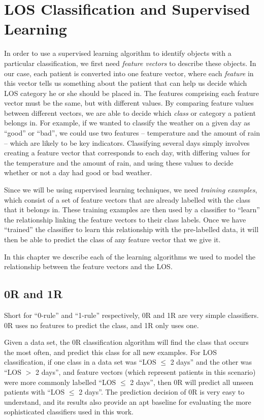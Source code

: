 \chapter{LOS Classification and Supervised Learning}
  \label{chap:classification}

In order to use a supervised learning algorithm to identify objects with
a particular classification, we first need \textit{feature vectors} to
describe these objects. In our case, each patient is converted into one
feature vector, where each \textit{feature} in this vector tells us
something about the
patient that can help us decide which LOS category he or she should be
placed in. The features comprising each feature vector must be the same,
but with different values. By comparing feature values between different
vectors, we are able to decide which \textit{class} or category a patient
belongs in. For example, if we wanted to classify the weather on a given
day as ``good'' or ``bad'', we could use two features -- temperature and
the amount of rain -- which are likely to be key indicators. Classifying
several days simply involves creating a feature vector that corresponds
to each day, with differing values for the temperature and the amount of
rain, and using these values to decide whether or not a day had good or
bad weather.

Since we will be using supervised learning techniques, we need
\textit{training examples}, which consist of a set of feature vectors
that are already labelled with the class that it belongs in. These
training examples are then used by a classifier to ``learn'' the
relationship linking the feature vectors to their class labels. Once we have
``trained'' the classifier to learn this relationship with the pre-labelled
data, it will then be able to predict the class of any feature vector that we
give it.

In this
chapter we describe each of the learning algorithms we used to model the
relationship between the feature vectors and the LOS.

\section{0R and 1R}
Short for ``0-rule'' and ``1-rule'' respectively, 0R and 1R are
very simple classifiers. 0R uses no features to predict the class, and
1R only uses one.

Given a data set, the 0R classification algorithm will find the class that
occurs the most often, and predict this class for all new examples. For LOS
classification, if one class in a data set was ``LOS $\leq$ 2 days'' and
the other was
``LOS $>$ 2 days'', and feature vectors (which represent patients in this
scenario) were more commonly labelled ``LOS $\leq$ 2 days'', then 0R will
predict all unseen patients with ``LOS $\leq$ 2 days''.
The prediction decision of 0R is very easy to understand,
and its results also provide an apt baseline for evaluating the more
sophisticated classifiers used in this work.

